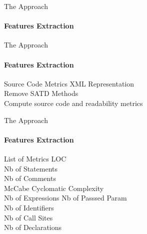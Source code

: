 \documentclass{beamer}
\begin{document}
\begin{darkframes}
    		\begin{frame}{The Approach}
	    		\framesubtitle{Features Extraction}
	    		\begin{figure}[t]
	    			\centering
	    		\end{figure}
	    	\end{frame}
    	
    	    \begin{frame}{The Approach}
    			\framesubtitle{Features Extraction}
    			\begin{figure}[t]
    				\centering
    			\end{figure}
    			\begin{block}{Source Code Metrics}
    				XML Representation\\
    				Remove SATD Methods\\
    				Compute source code and readability metrics
    			\end{block}
    		\end{frame}
    	
    	    \begin{frame}{The Approach}
    		\framesubtitle{Features Extraction}
    	    	\begin{exampleblock}{\small List of Metrics}
		    		\vspace{1mm}
		    			LOC\\
		    			Nb of Statements\\
		    			Nb of Comments\\
		    			McCabe Cyclomatic Complexity\\
		    			Nb of Expressions
		    			Nb of Passsed Param \\
		    			Nb of Identifiers \\
		    			Nb of Call Sites \\
		    			Nb of Declarations
		    	\end{exampleblock}
	    	\end{frame}
    	

\end{darkframes}
\end{document}
